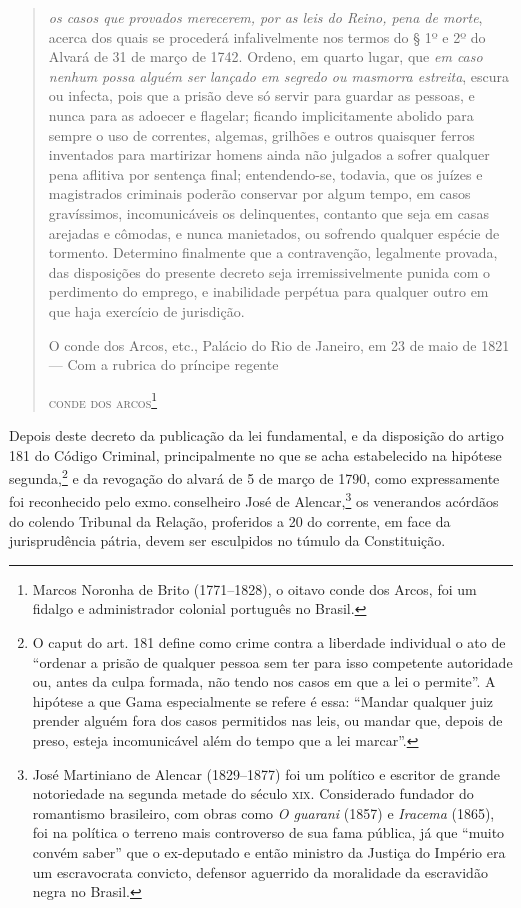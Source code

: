 {\begin{quote}
\emph{os casos que provados merecerem, por as leis do Reino, pena de
morte}, acerca dos quais se procederá infalivelmente nos termos do § 1º
e 2º do Alvará de 31 de março de 1742. Ordeno, em quarto lugar, que
\emph{em caso nenhum possa alguém ser lançado em segredo ou masmorra
estreita}, escura ou infecta, pois que a prisão deve só servir para
guardar as pessoas, e nunca para as adoecer e flagelar; ficando
implicitamente abolido para sempre o uso de correntes, algemas, grilhões
e outros quaisquer ferros inventados para martirizar homens ainda não
julgados a sofrer qualquer pena aflitiva por sentença final;
entendendo-se, todavia, que os juízes e magistrados criminais poderão
conservar por algum tempo, em casos gravíssimos, incomunicáveis os
delinquentes, contanto que seja em casas arejadas e cômodas, e nunca
manietados, ou sofrendo qualquer espécie de tormento. Determino
finalmente que a contravenção, legalmente provada, das disposições do
presente decreto seja irremissivelmente punida com o perdimento do
emprego, e inabilidade perpétua para qualquer outro em que haja
exercício de jurisdição.\medskip

\hfill\parbox{220pt}{O conde dos Arcos, etc., Palácio do Rio de Janeiro, em 23 de maio de
1821 --- Com a rubrica do príncipe regente}

\hfill\textsc{conde dos arcos}\footnote{Marcos Noronha de Brito (1771--1828), o
  oitavo conde dos Arcos, foi um fidalgo e administrador colonial
  português no Brasil.}
\end{quote}

Depois deste decreto da publicação da lei fundamental, e da disposição
do artigo 181 do Código Criminal, principalmente no que se acha
estabelecido na hipótese segunda,\footnote{O caput do art. 181
  define como crime contra a liberdade individual o ato de ``ordenar a
  prisão de qualquer pessoa sem ter para isso competente autoridade ou,
  antes da culpa formada, não tendo nos casos em que a lei o permite''. A
  hipótese a que Gama especialmente se refere é essa: ``Mandar qualquer
  juiz prender alguém fora dos casos permitidos nas leis, ou mandar que,
  depois de preso, esteja incomunicável além do tempo que a lei marcar''.}
e da revogação do alvará de 5 de março de 1790, como expressamente foi
reconhecido pelo exmo.\,conselheiro José de Alencar,\footnote{José
  Martiniano de Alencar (1829--1877) foi um político e escritor de grande
  notoriedade na segunda metade do século \textsc{xix}. Considerado fundador do
  romantismo brasileiro, com obras como \emph{O guarani} (1857) e
  \emph{Iracema} (1865), foi na política o terreno mais controverso de
  sua fama pública, já que ``muito convém saber'' que o ex-deputado e
  então ministro da Justiça do Império era um escravocrata convicto,
  defensor aguerrido da moralidade da escravidão negra no Brasil.}
os venerandos acórdãos do
colendo Tribunal da Relação, proferidos a 20 do corrente, em face da
jurisprudência pátria, devem ser esculpidos no túmulo da Constituição.\medskip

}
